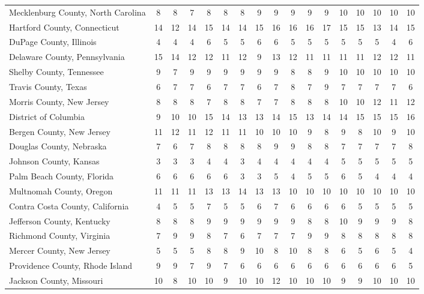 \begin{landscape}
\begin{longtable}{lcccccccccccccccc}
	Mecklenburg County, North Carolina & 8 & 8 & 7 & 8 & 8 & 8 & 9 & 9 & 9 & 9 & 9 & 10 & 10 & 10 & 10 & 10 \\
	Hartford County, Connecticut & 14 & 12 & 14 & 15 & 14 & 14 & 15 & 16 & 16 & 16 & 17 & 15 & 15 & 13 & 14 & 15 \\
	DuPage County, Illinois & 4 & 4 & 4 & 6 & 5 & 5 & 6 & 6 & 5 & 5 & 5 & 5 & 5 & 5 & 4 & 6 \\
	Delaware County, Pennsylvania & 15 & 14 & 12 & 12 & 11 & 12 & 9 & 13 & 12 & 11 & 11 & 11 & 11 & 12 & 12 & 11 \\
	Shelby County, Tennessee & 9 & 7 & 9 & 9 & 9 & 9 & 9 & 9 & 8 & 8 & 9 & 10 & 10 & 10 & 10 & 10 \\
	Travis County, Texas & 6 & 7 & 7 & 6 & 7 & 7 & 6 & 7 & 8 & 7 & 9 & 7 & 7 & 7 & 7 & 6 \\
	Morris County, New Jersey & 8 & 8 & 8 & 7 & 8 & 8 & 7 & 7 & 8 & 8 & 8 & 10 & 10 & 12 & 11 & 12 \\
	District of Columbia & 9 & 10 & 10 & 15 & 14 & 13 & 13 & 14 & 15 & 13 & 14 & 14 & 15 & 15 & 15 & 16 \\
	Bergen County, New Jersey & 11 & 12 & 11 & 12 & 11 & 11 & 10 & 10 & 10 & 9 & 8 & 9 & 8 & 10 & 9 & 10 \\
	Douglas County, Nebraska & 7 & 6 & 7 & 8 & 8 & 8 & 8 & 9 & 9 & 8 & 8 & 7 & 7 & 7 & 7 & 8 \\
	Johnson County, Kansas & 3 & 3 & 3 & 4 & 4 & 3 & 4 & 4 & 4 & 4 & 4 & 5 & 5 & 5 & 5 & 5 \\
	Palm Beach County, Florida & 6 & 6 & 6 & 6 & 6 & 3 & 3 & 5 & 4 & 5 & 5 & 6 & 5 & 4 & 4 & 4 \\
	Multnomah County, Oregon & 11 & 11 & 11 & 13 & 13 & 14 & 13 & 13 & 10 & 10 & 10 & 10 & 10 & 10 & 10 & 10 \\
	Contra Costa County, California & 4 & 5 & 5 & 7 & 5 & 5 & 6 & 7 & 6 & 6 & 6 & 6 & 5 & 5 & 5 & 5 \\
	Jefferson County, Kentucky & 8 & 8 & 8 & 9 & 9 & 9 & 9 & 9 & 9 & 8 & 8 & 10 & 9 & 9 & 9 & 8 \\
	Richmond County, Virginia & 7 & 9 & 9 & 8 & 7 & 6 & 7 & 7 & 7 & 9 & 9 & 8 & 8 & 8 & 8 & 8 \\
	Mercer County, New Jersey & 5 & 5 & 5 & 8 & 8 & 9 & 10 & 8 & 10 & 8 & 8 & 6 & 5 & 6 & 5 & 4 \\
	Providence County, Rhode Island & 9 & 9 & 7 & 9 & 7 & 6 & 6 & 6 & 6 & 6 & 6 & 6 & 6 & 6 & 6 & 5 \\
	Jackson County, Missouri & 10 & 8 & 10 & 10 & 9 & 10 & 10 & 12 & 10 & 10 & 10 & 9 & 9 & 10 & 10 & 10 \\

\end{longtable}
\end{landscape}
